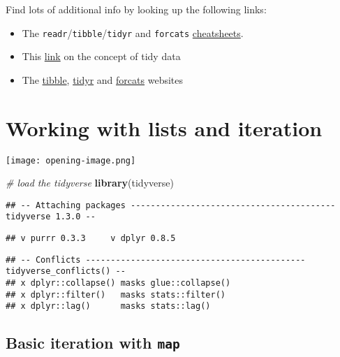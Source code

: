 \documentclass[
]{book}
\newenvironment{Shaded}{}{}
\newcommand{\CommentTok}[1]{\textcolor[rgb]{0.38,0.63,0.69}{\textit{#1}}}
\newcommand{\KeywordTok}[1]{\textcolor[rgb]{0.00,0.44,0.13}{\textbf{#1}}}
\newcommand{\NormalTok}[1]{#1}
\providecommand{\tightlist}{%
  \setlength{\itemsep}{0pt}\setlength{\parskip}{0pt}}
\begin{document}
Find lots of additional info by looking up the following links:

\begin{itemize}
\tightlist
\item
  The \texttt{readr}/\texttt{tibble}/\texttt{tidyr} and \texttt{forcats} \href{https://rstudio.com/resources/cheatsheets/}{cheatsheets}.
\item
  This \href{https://tidyr.tidyverse.org/articles/tidy-data.html}{link} on the concept of tidy data
\item
  The \href{https://tibble.tidyverse.org/}{tibble}, \href{https://tidyr.tidyverse.org/}{tidyr} and \href{https://forcats.tidyverse.org/}{forcats} websites
\end{itemize}

\hypertarget{working-with-lists-and-iteration}{%
\chapter{Working with lists and iteration}\label{working-with-lists-and-iteration}}

\texttt{[image: opening-image.png]}

\begin{Shaded}
\begin{Highlighting}[]
\CommentTok{# load the tidyverse}
\KeywordTok{library}\NormalTok{(tidyverse)}
\end{Highlighting}
\end{Shaded}

\begin{verbatim}
## -- Attaching packages ----------------------------------------- tidyverse 1.3.0 --
\end{verbatim}

\begin{verbatim}
## v purrr 0.3.3     v dplyr 0.8.5
\end{verbatim}

\begin{verbatim}
## -- Conflicts -------------------------------------------- tidyverse_conflicts() --
## x dplyr::collapse() masks glue::collapse()
## x dplyr::filter()   masks stats::filter()
## x dplyr::lag()      masks stats::lag()
\end{verbatim}

\hypertarget{basic-iteration-with-map}{%
\section{\texorpdfstring{Basic iteration with \texttt{map}}{Basic iteration with map}}\label{basic-iteration-with-map}}
\end{document}

